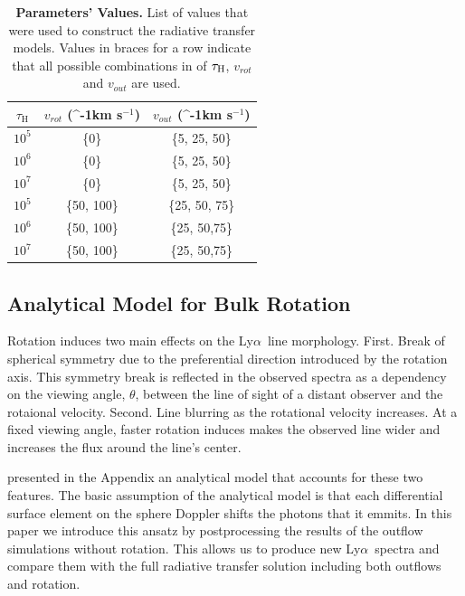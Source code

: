 \documentclass[a4paper,fleqn,usenatbib]{mnras}
\newcommand{\lya}{\ifmmode{{\rm Ly}\alpha}\else Ly$\alpha$\ \fi}
\newcommand{\kms}{\ifmmode\mathrm{km\ s}^{-1}\else km s$^{-1}$\fi}
\begin{document}
\begin{table}[htbp]
  \begin{center}
    \begin{tabular}{|c|c|c|}
      \hline
      $\tau_{\mathrm{H}}$ & $v_{rot}$ (\kms) & $v_{out}$ (\kms) \\
      \hline
      $10^5$  & \{0\} & \{5, 25, 50\} \\
      $10^6$ & \{0\} & \{5, 25, 50\}\\
      $10^7$ & \{0\} & \{5, 25, 50\}\\
      $10^5$  & \{50, 100\} & \{25, 50, 75\} \\
      $10^6$ & \{50, 100\} & \{25, 50,75\}\\
      $10^7$ & \{50, 100\} & \{25, 50,75\}\\
      \hline    
    \end{tabular}
  \end{center}
  \caption{\textbf{Parameters' Values.} List of values that were used
    to construct the radiative transfer models. Values in braces
    for a row indicate that all possible combinations in of
    $\tau_{\rm{H}}$,
    $v_{rot}$ and $v_{out}$ are used.}
  \label{tab:values}
\end{table}


\subsection{Analytical Model for Bulk Rotation}


Rotation induces two main effects on the \lya line morphology.
First. Break of spherical symmetry due to the 
  preferential direction introduced by the rotation axis.
  This symmetry break is reflected in the observed spectra as a
  dependency on the viewing angle, $\theta$, between the line of sight
  of a distant observer and the rotaional velocity.    
Second. Line blurring as the rotational velocity increases.
  At a fixed viewing angle, faster rotation induces makes the observed
  line wider and increases the flux around the line's center. 

  
\cite{Garavito14} presented in the Appendix an analytical model that
accounts for these two features.
The basic assumption of the analytical model is that each
differential surface element on the sphere Doppler shifts the photons
that it emmits.
In this paper we introduce this ansatz by postprocessing the results
of the outflow simulations without rotation.
This allows us to produce new \lya spectra and compare them with the
full radiative transfer solution including both outflows and
rotation. 
\end{document}
